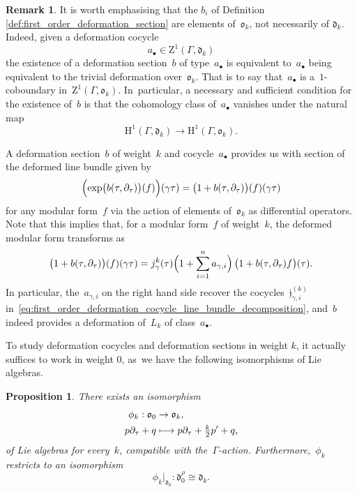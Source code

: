 \documentclass[JEP,XML,SOM,Unicode,published]{cedram}
\newcommand\mto{\mathchoice{\longmapsto}{\mapsto}{\mapsto}{\mapsto}}
\let\oldbullet\bullet
\renewcommand{\bullet}{{\scriptscriptstyle\oldbullet}}
\theoremstyle{plain}
\newtheorem{proposition}[theoremcounter]{Proposition}
\theoremstyle{definition}
\newtheorem{remark}[theoremcounter]{Remark}
\newcommand{\tx}{\text}
\newcommand{\nbd}{\nobreakdash-\hspace{0pt}}
\newcommand{\frakd}{\ensuremath{\mathfrak{d}}}
\newcommand{\frakj}{\ensuremath{\mathfrak{j}}}
\newcommand{\frako}{\ensuremath{\mathfrak{o}}}
\newcommand{\rmH}{\ensuremath{\mathrm{H}}}
\newcommand{\rmZ}{\ensuremath{\mathrm{Z}}}
\newcommand{\defcol}{\mathrel{:}}
\let\Ga\Gamma
\let\ga\gamma
\begin{document}
\begin{remark}
It is worth emphasising that the $b_i$ of Definition \ref{def:first_order_deformation_section} are elements of~$\frako_k$, not necessarily of $\frakd_k$. Indeed, given a deformation cocycle
\begin{equation*}a_\bullet\in \rmZ^1(\Ga,\frakd_k)\end{equation*}
the existence of a deformation section~$b$ of type~$a_\bullet$ is equivalent to~$a_\bullet$ being equivalent to the trivial deformation over~$\frako_k$. That is to say that~$a_\bullet$ is a~$1$-coboundary in~$\rmZ^1(\Ga,\frako_k)$. In~particular, a necessary and sufficient condition for the existence of~$b$ is that the cohomology class of~$a_\bullet$ vanishes under the natural map
\begin{equation*}\rmH^1(\Ga,\frakd_k) \to \rmH^1(\Ga,\frako_k)\tx{.}\end{equation*}
\end{remark}

A deformation section~$b$ of weight~$k$ and cocycle~$a_\bullet$ provides us with section of the deformed line bundle given by
\begin{equation}
\label{eq:first_order_deformation_modular_forms}
\Bigl(\exp\bigl(b(\tau, \partial_\tau) \bigr) (f) \Bigr)(\ga\tau)
=
\bigl(1 + b(\tau, \partial_\tau) \bigr)(f)(\ga\tau)
\end{equation}
for any modular form~$f$ via the action of elements of~$\frako_k$ as differential operators. Note that this implies that, for a modular form~$f$ of weight~$k$, the deformed modular form transforms as
\begin{equation*}
\bigl(1 + b(\tau, \partial_\tau) \bigr)(f)(\ga\tau)
=
j_\gamma^{k}(\tau) \Bigl(1+\sum_{i=1}^n a_{\ga,i}\Bigr)\, \bigl(1+ b(\tau,\partial_\tau) f \bigr)(\tau)
\tx{.}
\end{equation*}
In particular, the~$a_{\ga,i}$ on the right hand side recover the cocycles~$\frakj^{(k)}_{\ga,i}$ in~\eqref{eq:first_order_deformation_cocycle_line_bundle_decomposition}, and~$b$ indeed provides a deformation of~$L_k$ of class~$a_\bullet$.

To study deformation cocycles and deformation sections in weight $k$, it actually suffices to work in weight $0$, as~we have the following isomorphisms of Lie algebras.

\begin{proposition}
\label{prop:weight-indep}
There exists an isomorphism
\begin{align*}
\phi_k \defcol
\frako_0 &\to \frako_k
\tx{,}\\
p\partial_\tau + q &\mto p\partial_\tau + \tfrac{k}{2}p^\prime + q
\tx{,}
\end{align*}
of Lie algebras for every~$k$, compatible with the~$\Ga$\nbd{}action. Furthermore,~$\phi_k$ restricts to an isomorphism
\begin{equation*}
\phi_k \big|_{\frakd_0} \defcol \frakd_0^\rho\cong\frakd_k
\tx{.}
\end{equation*}
\end{proposition}
\end{document}

